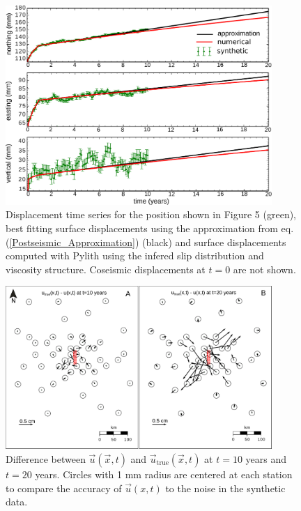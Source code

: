 \documentclass[extra]{gji}
\begin{document}
\begin{figure}[h!]\label{figure6}
  \centering
  \includegraphics[width=0.9\textwidth]{FinalFigures/Figure5.pdf}
  \caption{Displacement time series for the position shown in Figure 5
    (green), best fitting surface displacements using the
    approximation from eq. (\ref{Postseismic_Approximation}) (black)
    and surface displacements computed with Pylith using the infered
    slip distribution and viscosity structure. Coseismic displacements
    at $t=0$ are not shown.}
  \label{Figure 6}
\end{figure}

\begin{figure}[h!]\label{figure7}
  \centering
  \includegraphics[width=0.9\textwidth]{FinalFigures/Figure7.pdf}
  \caption{Difference between $\vec{u}(\vec{x},t)$ and
    $\vec{u}_{\mathrm{true}}(\vec{x},t)$ at $t=10$ years and $t=20$ years.
    Circles with 1 mm radius are centered at each station to compare
    the accuracy of $\vec{u}(x,t)$ to the noise in
    the synthetic data.}
  \label{Figure 7}
\end{figure}
\end{document}
